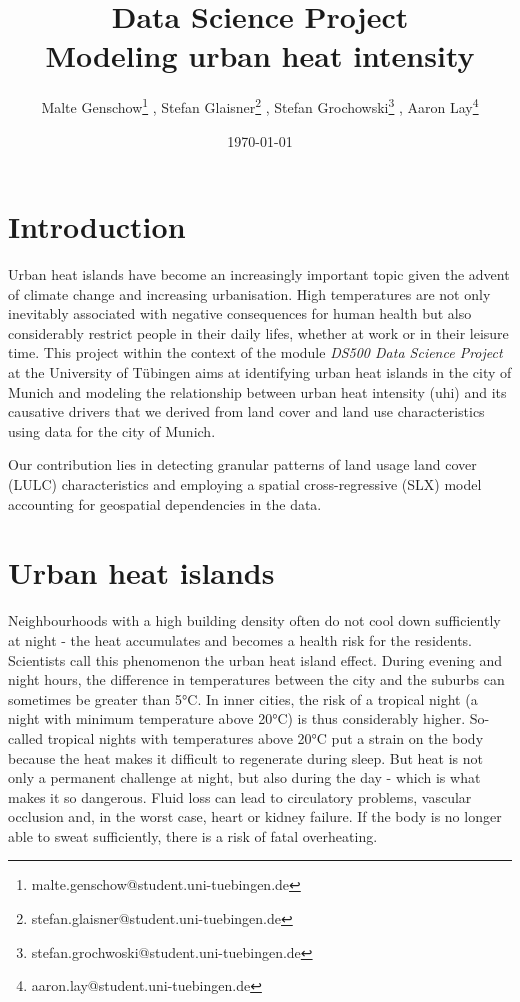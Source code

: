 \documentclass[12pt]{article}
\title{\vspace{-2cm} Data Science Project \\ Modeling urban heat intensity}
\author{Malte Genschow\thanks{malte.genschow@student.uni-tuebingen.de} , Stefan Glaisner\thanks{stefan.glaisner@student.uni-tuebingen.de} , Stefan Grochowski\thanks{stefan.grochwoski@student.uni-tuebingen.de} , Aaron Lay\thanks{aaron.lay@student.uni-tuebingen.de}}
\date{\today}
\begin{document}
\maketitle



\section{Introduction}

Urban heat islands have become an increasingly important topic given the advent of climate change and increasing urbanisation. High temperatures are not only inevitably associated with negative consequences for human health \citep{anderson2009,basu2002,basu2009} but also considerably restrict people in their daily lifes, whether at work or in their leisure time. This project within the context of the module \emph{DS500 Data Science Project} at the University of Tübingen aims at identifying urban heat islands in the city of Munich and modeling the relationship between urban heat intensity (\acrshort{uhi}) and its causative drivers that we derived from land cover and land use characteristics using data for the city of Munich.

Our contribution lies in detecting granular patterns of land usage land cover (LULC) characteristics and employing a spatial cross-regressive (SLX) model accounting for geospatial dependencies in the data.


\section{Urban heat islands}

Neighbourhoods with a high building density often do not cool down sufficiently at night - the heat accumulates and becomes a health risk for the residents. Scientists call this phenomenon the urban heat island effect. During evening and night hours, the difference in temperatures between the city and the suburbs can sometimes be greater than 5°C. In inner cities, the risk of a tropical night (a night with minimum temperature above 20°C) is thus considerably higher. So-called tropical nights with temperatures above 20°C put a strain on the body because the heat makes it difficult to regenerate during sleep. But heat is not only a permanent challenge at night, but also during the day - which is what makes it so dangerous. Fluid loss can lead to circulatory problems, vascular occlusion and, in the worst case, heart or kidney failure. If the body is no longer able to sweat sufficiently, there is a risk of fatal overheating.
\end{document}
